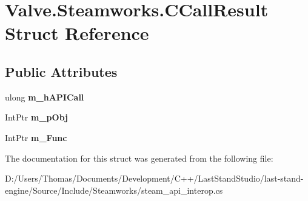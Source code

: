 \hypertarget{structValve_1_1Steamworks_1_1CCallResult}{}\section{Valve.\+Steamworks.\+C\+Call\+Result Struct Reference}
\label{structValve_1_1Steamworks_1_1CCallResult}
\subsection*{Public Attributes}
\begin{DoxyCompactItemize}
\item 
\hypertarget{structValve_1_1Steamworks_1_1CCallResult_a347f7fe3b2bc95b32d74dea8a0cd4822}{}ulong {\bfseries m\+\_\+h\+A\+P\+I\+Call}\label{structValve_1_1Steamworks_1_1CCallResult_a347f7fe3b2bc95b32d74dea8a0cd4822}

\item 
\hypertarget{structValve_1_1Steamworks_1_1CCallResult_ab614e98ba0d58a49ab7317f6e99fe981}{}Int\+Ptr {\bfseries m\+\_\+p\+Obj}\label{structValve_1_1Steamworks_1_1CCallResult_ab614e98ba0d58a49ab7317f6e99fe981}

\item 
\hypertarget{structValve_1_1Steamworks_1_1CCallResult_a2012c76fd29c778fba178bfeee9bfc5e}{}Int\+Ptr {\bfseries m\+\_\+\+Func}\label{structValve_1_1Steamworks_1_1CCallResult_a2012c76fd29c778fba178bfeee9bfc5e}

\end{DoxyCompactItemize}


The documentation for this struct was generated from the following file\+:\begin{DoxyCompactItemize}
\item 
D\+:/\+Users/\+Thomas/\+Documents/\+Development/\+C++/\+Last\+Stand\+Studio/last-\/stand-\/engine/\+Source/\+Include/\+Steamworks/steam\+\_\+api\+\_\+interop.\+cs\end{DoxyCompactItemize}
